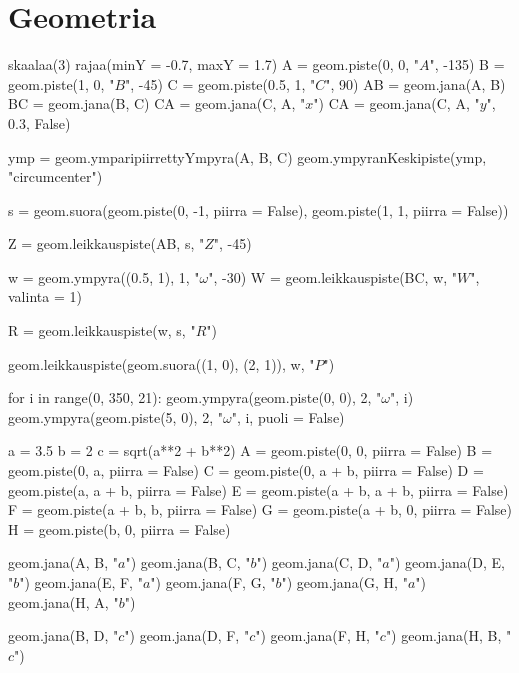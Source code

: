 \section{Geometria}
\begin{kuva}
skaalaa(3)
rajaa(minY = -0.7, maxY = 1.7)
A = geom.piste(0, 0, "$A$", -135)
B = geom.piste(1, 0, "$B$", -45)
C = geom.piste(0.5, 1, "$C$", 90)
AB = geom.jana(A, B)
BC = geom.jana(B, C)
CA = geom.jana(C, A, "$x$")
CA = geom.jana(C, A, "$y$", 0.3, False)

ymp = geom.ymparipiirrettyYmpyra(A, B, C)
geom.ympyranKeskipiste(ymp, "circumcenter")

s = geom.suora(geom.piste(0, -1, piirra = False), geom.piste(1, 1, piirra = False))

Z = geom.leikkauspiste(AB, s, "$Z$", -45)

w = geom.ympyra((0.5, 1), 1, "$\omega$", -30)
W = geom.leikkauspiste(BC, w, "$W$", valinta = 1)

R = geom.leikkauspiste(w, s, "$R$")

geom.leikkauspiste(geom.suora((1, 0), (2, 1)), w, "$P$")
\end{kuva}

\begin{kuva}
for i in range(0, 350, 21):
	geom.ympyra(geom.piste(0, 0), 2, "$\omega$", i)
	geom.ympyra(geom.piste(5, 0), 2, "$\omega$", i, puoli = False)

\end{kuva}

\begin{kuva}
a = 3.5
b = 2
c = sqrt(a**2 + b**2)
A = geom.piste(0, 0, piirra = False)
B = geom.piste(0, a, piirra = False)
C = geom.piste(0, a + b, piirra = False)
D = geom.piste(a, a + b, piirra = False)
E = geom.piste(a + b, a + b, piirra = False)
F = geom.piste(a + b, b, piirra = False)
G = geom.piste(a + b, 0, piirra = False)
H = geom.piste(b, 0, piirra = False)

geom.jana(A, B, "$a$")
geom.jana(B, C, "$b$")
geom.jana(C, D, "$a$")
geom.jana(D, E, "$b$")
geom.jana(E, F, "$a$")
geom.jana(F, G, "$b$")
geom.jana(G, H, "$a$")
geom.jana(H, A, "$b$")

geom.jana(B, D, "$c$")
geom.jana(D, F, "$c$")
geom.jana(F, H, "$c$")
geom.jana(H, B, "$c$")
\end{kuva}
